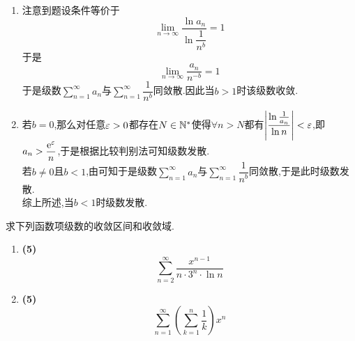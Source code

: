 \documentclass{ctexart}
\begin{document}
\begin{solution}
    \begin{enumerate}[label=\tbf{(\arabic*)},topsep=0pt,parsep=0pt,itemsep=0pt,partopsep=0pt]
        \item 注意到题设条件等价于
            \[\lim_{n\to\infty}\dfrac{\ln a_n}{\ln\dfrac{1}{n^b}}=1\]
            于是
            \[\lim_{n\to\infty}\dfrac{a_n}{n^{-b}}=1\]
            于是级数$\displaystyle\sum_{n=1}^{\infty}a_n$与$\displaystyle\sum_{n=1}^{\infty}\dfrac{1}{n^b}$同敛散.因此当$b>1$时该级数收敛.
        \item 若$b=0$,那么对任意$\varepsilon>0$都存在$N\in\mathbb{N}^*$使得$\forall n>N$都有$\left|\dfrac{\ln\frac{1}{a_n}}{\ln n}\right|<\varepsilon$,即$a_n>\dfrac{\mathrm{e}^{\varepsilon}}{n}$,于是根据比较判别法可知级数发散.\\
            若$b\neq0$且$b<1$,由可知于是级数$\displaystyle\sum_{n=1}^{\infty}a_n$与$\displaystyle\sum_{n=1}^{\infty}\dfrac{1}{n^b}$同敛散,于是此时级数发散.\\
            综上所述,当$b<1$时级数发散.
    \end{enumerate}
\end{solution}
\begin{problem}[4.(10\songti{分})]
    求下列函数项级数的收敛区间和收敛域.
    \begin{enumerate}[label=\tbf{(\arabic*)},topsep=0pt,parsep=0pt,itemsep=0pt,partopsep=0pt]
        \item \textbf{(5)}\ 
            \[\sum_{n=2}^{\infty}\dfrac{x^{n-1}}{n\cdot3^n\cdot\ln n}\]
        \item \textbf{(5\songti{分})}\ 
            \[\sum_{n=1}^{\infty}\left(\sum_{k=1}^{n}\dfrac{1}{k}\right)x^n\]

    \end{enumerate}
\end{problem}
\end{document}
